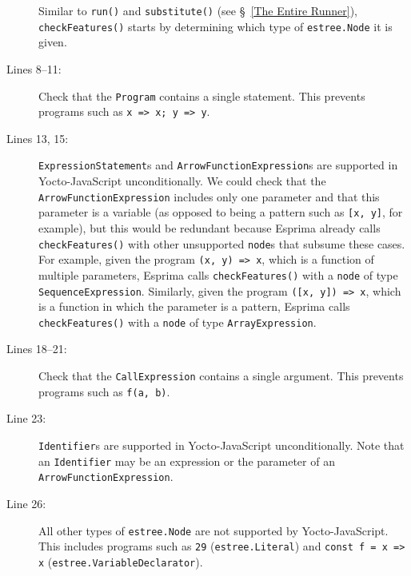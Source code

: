 \documentclass[12pt, oneside]{book}
\begin{document}
\begin{description}
Similar to \texttt{run()} and \texttt{substitute()} (see §~\ref{The Entire Runner}), \texttt{checkFeatures()} starts by determining which type of \texttt{estree.Node} it is given.

\item [Lines 8–11:]

Check that the \texttt{Program} contains a single statement. This prevents programs such as \texttt{x => x; y => y}.

\item [Lines 13, 15:]

\texttt{ExpressionStatement}s and \texttt{ArrowFunctionExpression}s are supported in Yocto-JavaScript unconditionally. We could check that the \texttt{ArrowFunctionExpression} includes only one parameter and that this parameter is a variable (as opposed to being a pattern such as \texttt{[x, y]}, for example), but this would be redundant because Esprima already calls \texttt{checkFeatures()} with other unsupported \texttt{node}s that subsume these cases. For example, given the program \texttt{(x, y) => x}, which is a function of multiple parameters, Esprima calls \texttt{checkFeatures()} with a \texttt{node} of type \texttt{SequenceExpression}. Similarly, given the program \texttt{([x, y]) => x}, which is a function in which the parameter is a pattern, Esprima calls \texttt{checkFeatures()} with a \texttt{node} of type \texttt{ArrayExpression}.

\item [Lines 18–21:]

Check that the \texttt{CallExpression} contains a single argument. This prevents programs such as \texttt{f(a, b)}.

\item [Line 23:]

\texttt{Identifier}s are supported in Yocto-JavaScript unconditionally. Note that an \texttt{Identifier} may be an expression or the parameter of an \texttt{ArrowFunctionExpression}.

\item [Line 26:]

All other types of \texttt{estree.Node} are not supported by Yocto-JavaScript. This includes programs such as \texttt{29} (\texttt{estree.Literal}) and \texttt{const f = x => x} (\texttt{estree.VariableDeclarator}).
\end{description}
\end{document}
